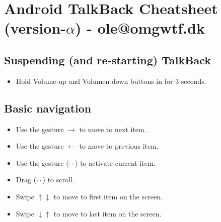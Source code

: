 \documentclass[a4paper, landscape, 10pt]{scrartcl}
\begin{document}
\thispagestyle{empty}

\section*{Android TalkBack Cheatsheet (version-$\alpha$) - ole@omgwtf.dk}

\hrulefill{}

\begin{multicols}{2}

\subsection*{Suspending (and re-starting) TalkBack}
\begin{itemize}
\item{Hold Volume-up and Volumen-down buttons in for 3 seconds.}
\end{itemize}



\subsection*{Basic navigation}
\begin{itemize}
\item{Use the gesture $\rightarrow$ to move to next item.}
\item{Use the gesture $\leftarrow$ to move to previous item.}
\item{Use the gesture ($\cdot\cdot$) to activate current item.}
\item{Drag ($\cdot\cdot$) to scroll.}
\item{Swipe $\uparrow$$\downarrow$ to move to first item on the screen.}
\item{Swipe $\downarrow$$\uparrow$ to move to last item on the screen.}
\end{itemize}


\end{multicols}
\end{document}
